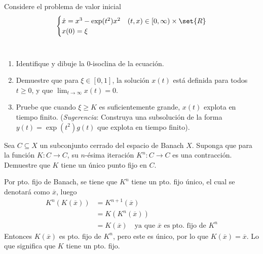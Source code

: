 \documentclass{homework}
\begin{document}
\begin{sol}

\end{sol}

\begin{prob}
    Considere el problema de valor inicial
    \[\begin{cases}
            \dot{x}=x^3-\exp(t^2)x^2 & (t,x)\in[0,\infty)\times\set{R} \\
            x(0)=\xi
        \end{cases}\]\
    \begin{enumerate}
        \item Identifique y dibuje la 0-isoclina de la ecuación.
        \item Demuestre que para \(\xi\in[0,1]\), la solución \(x(t)\) está definida para todos \(t\geq0\), y que \(\lim_{t\rightarrow\infty}x(t)=0\).
        \item Pruebe que cuando \(\xi\geq K\) es suficientemente grande, \(x(t)\) explota en tiempo finito. (\textit{Sugerencia}: Construya una subsolución de la forma \(y(t)=\exp(t^2)g(t)\) que explota en tiempo finito).
    \end{enumerate}
\end{prob}

\begin{sol}

\end{sol}

\begin{prob}
    Sea \(C\subseteq X\) un subconjunto cerrado del espacio de Banach \(X\). Suponga que para la función \(K:C\rightarrow C\), su \(n\)-ésima iteración \(K^n:C\rightarrow C\) es una contracción. Demuestre que \(K\) tiene un único punto fijo en \(C\).
\end{prob}

\begin{sol}
    Por pto. fijo de Banach, se tiene que \(K^n\) tiene un pto. fijo único, el cual se denotará como \(\overline{x}\), luego
    \begin{align*}
        K^n(K(\overline{x}))&=K^{n+1}(\overline{x})\\
        &=K(K^n(\overline{x}))\\
        &=K(\overline{x})\quad\text{ya que \(\overline{x}\) es pto. fijo de \(K^n\)}
    \end{align*}
    Entonces \(K(\overline{x})\) es pto. fijo de \(K^n\), pero este es único, por lo que \(K(\overline{x})=\overline{x}\). Lo que significa que \(K\) tiene un pto. fijo.
\end{sol}
\end{document}
